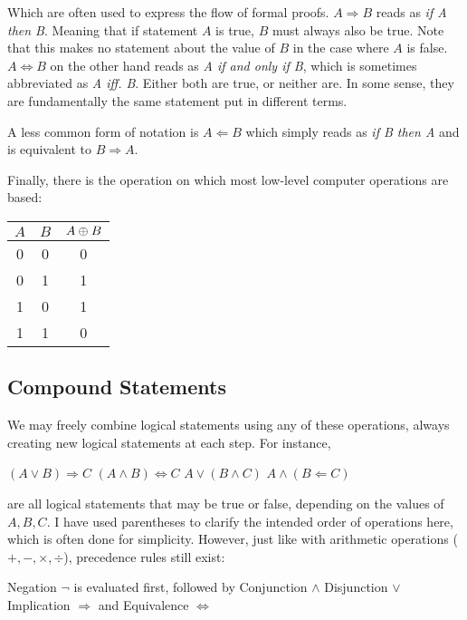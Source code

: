 {Which are often used to express the flow of formal proofs.
\(A \Rightarrow B\) reads as \emph{if A then B}. Meaning that if statement \(A\)
is true, \(B\) must always also be true. Note that this makes no statement
about the value of \(B\) in the case where \(A\) is false.
\(A \Leftrightarrow B\) on the other hand reads as \emph{A if and only if B}, which is sometimes
abbreviated as \emph{A iff. B}.
Either both are true, or neither are. In some sense, they are fundamentally the
same statement put in different terms.

A less common form of notation is \(A \Leftarrow B\) which simply reads as
\emph{if B then A} and is equivalent to \(B \Rightarrow A\).

Finally, there is the operation on which most low-level computer operations are
based:

\begin{tcolorbox}[colframe=gray!80, colback=white, boxrule=0.4pt, top=4pt, bottom=4pt]
  \begin{minipage}[t]{\textwidth}
    \centering
    \vspace{-10pt}
    \vspace{3pt}
    \begin{tabular}{cc c}
      \(A\) & \(B\) & \(A \oplus B\)\\
      \midrule
      0 & 0 & 0 \\
      0 & 1 & 1 \\
      1 & 0 & 1 \\
      1 & 1 & 0 \\
    \end{tabular}
  \end{minipage}
\end{tcolorbox}
}

\subsection{Compound Statements}
We may freely combine logical statements using any of these operations, always
creating new logical statements at each step. For instance,
\begin{example}
  \((A \lor B) \Rightarrow C\)
  \hfill
  \((A \land B) \Leftrightarrow C\)
  \hfill
  \(A \lor (B \land C)\)
  \hfill
  \(A \land (B \Leftarrow C)\)
\end{example}

are all logical statements that may be true or false, depending on the values of
\(A, B, C\).
I have used parentheses to clarify the intended order of operations here, which
is often done for simplicity. However, just like with arithmetic operations
(\(+, -, \times, \div\)), precedence rules still exist:
\begin{itemize}
  \ii{} Negation \(\neg\) is evaluated first, followed by
  \ii{} Conjunction \(\land\)
  \ii{} Disjunction \(\lor\)
  \ii{} Implication \(\Rightarrow\) and
  \ii{} Equivalence \(\Leftrightarrow\)
\end{itemize}

